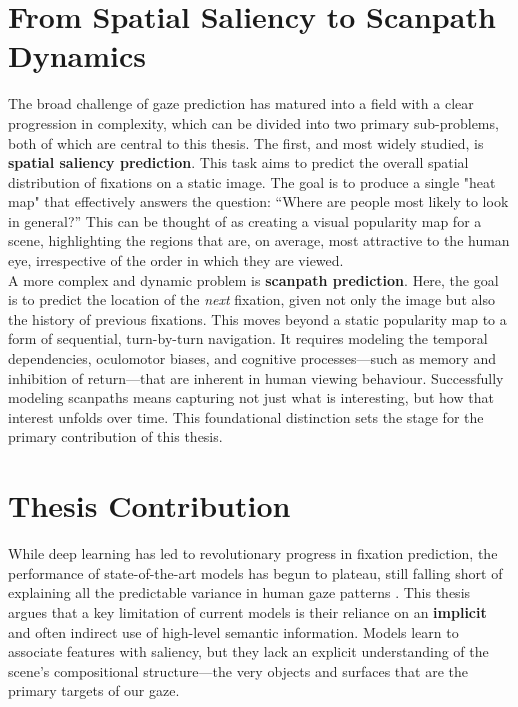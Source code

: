 \section{From Spatial Saliency to Scanpath Dynamics}
\label{sec:intro_taxonomy}

The broad challenge of gaze prediction has matured into a field with a clear progression in complexity, which can be divided into two primary sub-problems, both of which are central to this thesis.
The first, and most widely studied, is \textbf{spatial saliency prediction}. This task aims to predict the overall spatial distribution of fixations on a static image. The goal is to produce a single "heat map" that effectively answers the question: ``Where are people most likely to look in general?'' This can be thought of as creating a visual popularity map for a scene, highlighting the regions that are, on average, most attractive to the human eye, irrespective of the order in which they are viewed.\\
A more complex and dynamic problem is \textbf{scanpath prediction}. Here, the goal is to predict the location of the \textit{next} fixation, given not only the image but also the history of previous fixations. This moves beyond a static popularity map to a form of sequential, turn-by-turn navigation. It requires modeling the temporal dependencies, oculomotor biases, and cognitive processes—such as memory and inhibition of return—that are inherent in human viewing behaviour. Successfully modeling scanpaths means capturing not just what is interesting, but how that interest unfolds over time. This foundational distinction sets the stage for the primary contribution of this thesis.
\section{Thesis Contribution}
\label{sec:intro_contribution}

While deep learning has led to revolutionary progress in fixation prediction, the performance of state-of-the-art models has begun to plateau, still falling short of explaining all the predictable variance in human gaze patterns \cite{kummerer2023predicting, kummerer2022deepgaze}.
This thesis argues that a key limitation of current models is their reliance on an \textbf{implicit} and often indirect use of high-level semantic information. Models learn to associate features with saliency, but they lack an explicit understanding of the scene's compositional structure—the very objects and surfaces that are the primary targets of our gaze.

